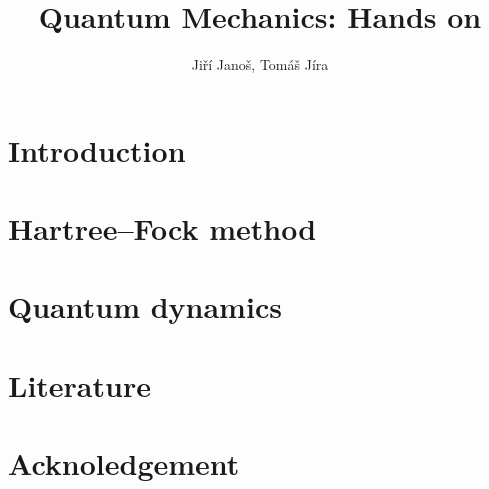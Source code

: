 \documentclass[paper=b5,parskip=half,open=any,headsepline=true,11pt]{scrbook}
\title{Quantum Mechanics: Hands on}
\author{Jiří Janoš, Tomáš Jíra}
\begin{document}
\frontmatter
\pagestyle{scrheadings}



\tableofcontents

\chapter{Introduction}
\label{kap:uvod}


\mainmatter

\chapter{Hartree--Fock method}
\label{kap:hf}


\chapter{Quantum dynamics}
\label{kap:qd}




\chapter{Literature}
\label{kap:literatura}


% 

\chapter{Acknoledgement}
\label{kap:podekovani}


\printglossary
\printglossary[type=\acronymtype,title=List of acronyms]


\renewcommand*{\lstlistlistingname}{List of codes}
\lstlistoflistings
{}

\backmatter
\printindex
\end{document}
